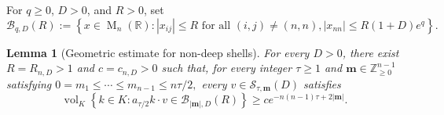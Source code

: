 \documentclass[reqno,11pt]{amsart}
\numberwithin{equation}{section}
\newtheorem{lemma}[theorem]{Lemma}
\theoremstyle{definition}
\theoremstyle{remark}
\newcommand{\op}{\operatorname}
\newcommand{\M}{\op{M}}
\begin{document}
For $q\ge0$, $D>0$, and $R>0$, set
$$
\mathcal B_{q,D}(R)
:=
\left\{x\in\M_n(\mathbb R):
|x_{ij}|\le R \text{ for all }(i,j)\ne(n,n),
|x_{nn}|\le R(1+D)e^q
\right\}.
$$

\begin{lemma}[Geometric estimate for non-deep shells]
\label{lem:one-long-direction-box}
For every $D>0$, there exist $R=R_{n,D}>1$ and
$c=c_{n,D}>0$ such that, for every integer $\tau\ge1$ and 
$\mathbf m\in\mathbb Z_{\ge0}^{n-1}$ satisfying
$
0=m_1\le\cdots\le m_{n-1}\le n\tau/2,
$
every
$v\in\mathcal S_{\tau,\mathbf m}(D)$ satisfies
\begin{equation}\label{eq:one-long-direction-lower-bound}
\operatorname{vol}_K
\left\{k\in K:
a_{\tau/2}k\cdot v\in\mathcal B_{|\mathbf m|,D}(R)
\right\}
\ge
c e^{-n(n-1)\tau+2|\mathbf m|}.
\end{equation}
\end{lemma}
\end{document}
